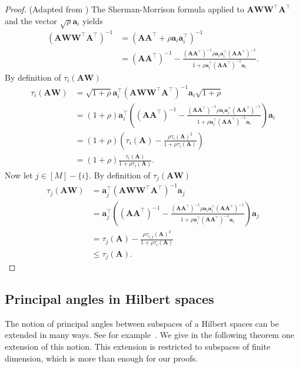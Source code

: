 \documentclass[twoside,11pt]{book}
\numberwithin{theorem}{chapter}
\numberwithin{definition}{chapter}
\numberwithin{proposition}{chapter}
\numberwithin{corollary}{chapter}
\numberwithin{example}{chapter}
\numberwithin{lemma}{chapter}
\numberwithin{assumption}{chapter}
\numberwithin{equation}{chapter}
\numberwithin{figure}{chapter}
\DeclareMathOperator{\Tran}{\intercal}
\begin{document}
\begin{proof}(Adapted from \cite{Coh15})
The Sherman-Morrison formula applied to $\bm{A}\bm{W}\bm{W}^{\Tran}\bm{A}^{\Tran}$ and the vector $\sqrt{\rho} \bm{a}_{i}$ yields
\begin{align}
(\bm{A}\bm{W}\bm{W}^{\Tran}\bm{A}^{\Tran})^{-1} &  = (\bm{A}\bm{A}^{\Tran} + \rho \bm{a}_{i}\bm{a}_{i}^{\Tran})^{-1} \\
& = (\bm{A}\bm{A}^{\Tran})^{-1} - \frac{(\bm{A}\bm{A}^{\Tran})^{-1}\rho \bm{a}_{i}\bm{a}_{i}^{\Tran} (\bm{A}\bm{A}^{\Tran})^{-1}}{1+ \rho \bm{a}_{i}^{\Tran}(\bm{A}\bm{A}^{\Tran})^{-1}\bm{a}_{i}}.
\end{align}
By definition of $\tau_{i}(\bm{A}\bm{W})$
\begin{align}
\tau_{i}(\bm{A}\bm{W}) & = \sqrt{1 + \rho} \bm{a}_{i}^{\Tran}(\bm{A}\bm{W}\bm{W}^{\Tran}\bm{A}^{\Tran})^{-1}\bm{a}_{i}\sqrt{1 + \rho}\\
& = (1+\rho)\bm{a}_{i}^{\Tran} \left( (\bm{A}\bm{A}^{\Tran})^{-1} - \frac{(\bm{A}\bm{A}^{\Tran})^{-1}\rho \bm{a}_{i}\bm{a}_{i}^{\Tran} (\bm{A}\bm{A}^{\Tran})^{-1}}{1+ \rho \bm{a}_{i}^{\Tran}(\bm{A}\bm{A}^{\Tran})^{-1}\bm{a}_{i}} \right) \bm{a}_{i} \nonumber\\
& = (1+\rho) \left(\tau_{i}(\bm{A}) - \frac{\rho \tau_{i}(\bm{A})^{2}}{1+\rho \tau_{i}(\bm{A})} \right) \nonumber\\
& = (1+\rho)\frac{\tau_{i}(\bm{A})}{1+\rho \tau_{i}(\bm{A})} \nonumber.
\end{align}
Now let $j \in [M]-\{i\}$. By definition of $\tau_{j}(\bm{A}\bm{W})$
\begin{align}
\tau_{j}(\bm{A}\bm{W}) & =  \bm{a}_{j}^{\Tran}(\bm{A}\bm{W}\bm{W}^{\Tran}\bm{A}^{\Tran})^{-1}\bm{a}_{j}\\
& = \bm{a}_{j}^{\Tran} \left( (\bm{A}\bm{A}^{\Tran})^{-1} - \frac{(\bm{A}\bm{A}^{\Tran})^{-1}\rho \bm{a}_{i}\bm{a}_{i}^{\Tran} (\bm{A}\bm{A}^{\Tran})^{-1}}{1+ \rho \bm{a}_{i}^{\Tran}(\bm{A}\bm{A}^{\Tran})^{-1}\bm{a}_{i}} \right) \bm{a}_{j} \nonumber\\
& =  \tau_{j}(\bm{A}) - \frac{\rho \tau_{i,j}(\bm{A})^{2}}{1+\rho \tau_{i}(\bm{A})} \nonumber\\
& \leq \tau_{j}(\bm{A}) \nonumber.
\end{align}
\end{proof}



\subsection{Principal angles in Hilbert spaces}\label{sec:proof_principal_angles}
The notion of principal angles between subspaces of a Hilbert spaces can be extended in many ways. See for example~\parencite{Deu95}. We give in the following theorem  one extension of this notion. This extension is restricted to subspaces of finite dimension, which is more than enough for our proofs.
\end{document}
